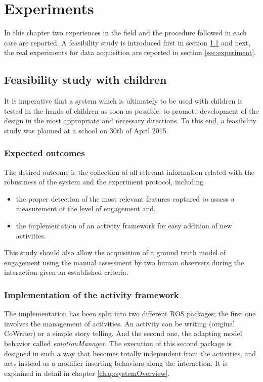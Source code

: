 \chapter{Experiments} \label{chap:feasibility}

In this chapter two experiences in the field and the procedure followed in each case are reported. A feasibility study is introduced first in section \ref{sec:feasibility} and next, the real experiments for data acquisition are reported in section \ref{sec:experiment}.

\section{Feasibility study with children}\label{sec:feasibility}
It is imperative that a system which is ultimately to be used with children is tested in the hands
of children as soon as possible, to promote development of the design in the most appropriate
and necessary directions. To this end, a feasibility study was planned at a school on 30th of April
2015.

\subsection{Expected outcomes}

The desired outcome is the collection of all relevant information related with the robustness of the system and the experiment protocol, including

\begin{itemize}
\item the proper detection of the most relevant features captured to assess a measurement of the level of engagement and,
\item the implementation of an activity framework for easy addition of new activities.
\end{itemize}

This study should also allow the acquisition of a ground truth model of engagement using the manual assessment by two human observers during the interaction given an established criteria.

\subsection{Implementation of the activity framework}
The implementation has been split into two different ROS packages; the first one involves the management of activities. An activity can be writing (original CoWriter) or a simple story telling. And the second one, the adapting model behavior called \textit{emotionManager}. The execution of this second package is designed in such a way that becomes totally independent from the activities, and acts instead as a modifier inserting behaviors along the interaction. It is explained in detail in chapter \ref{chap:systemOverview}.

